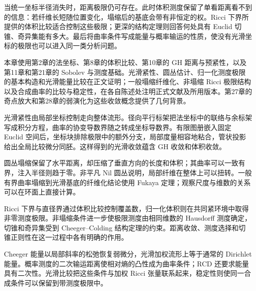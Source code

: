 \ProseParagraphBreak
当统一坐标半径消失时，距离极限仍可存在。此时体积测度保留了单看距离看不到的信息：若纤维长短随位置变化，塌缩后的基底会带有非恒定的权。Ricci 下界所提供的体积比较适合控制这些极限；更深的结构定理则回答何处具有 Euclid 切锥、奇异集能有多大。最后将曲率条件写成能量与概率输运的性质，使没有光滑坐标的极限也可以进入同一类分析问题。

\ProseParagraphBreak
本章使用第2章的法坐标、第8章的体积比较、第10章的 GH 距离与预紧性，以及第11章和第21章的 Sobolev 与测度基础。光滑紧性、圆丛估计、归一化测度极限的基本构造和光滑能量比较在正文证明；一般塌缩纤维化、非塌缩 Ricci 极限结构以及合成曲率的比较与稳定性，在各自陈述处注明正式文献及所用版本。第27章的奇点放大和第28章的弱演化为这些收敛概念提供了几何背景。






\begin{chaptersummary}
	光滑紧性由局部坐标控制走向整体流形。径向平行标架把法坐标中的联络与余标架写成积分方程，曲率的协变导数界随之转成坐标导数界。有限图册嵌入固定 Euclid 空间后，坐标块排除极限中的额外分支，局部度量相容地粘合，管状投影给出全局比较微分同胚。这样得到的光滑收敛蕴含 GH 收敛和体积收敛。

	\ProseParagraphBreak
	圆丛塌缩保留了水平距离，却压缩了垂直方向的长度和体积；其曲率可以一致有界，注入半径则趋于零。非平凡 Nil 圆丛说明，局部纤维在整体上可以扭转。一般有界曲率塌缩到光滑基底的纤维化结论使用 Fukaya 定理；观察尺度与维数的关系可以在环面上直接计算。

	\ProseParagraphBreak
	Ricci 下界与直径界通过体积比较控制覆盖数，归一化体积则在共同紧环境中取得非零测度极限。非塌缩条件进一步使极限测度由相同维数的 Hausdorff 测度确定，切锥和奇异集受到 Cheeger--Colding 结构定理的约束。距离收敛、测度选择和切锥正则性在这一过程中各有明确的作用。

	\ProseParagraphBreak
	Cheeger 能量以局部斜率的松弛恢复弱微分，光滑加权流形上等于通常的 Dirichlet 能量。概率测度的二次输运距离使相对熵的凸性成为曲率条件；RCD 还要求能量具有二次性。光滑比较把这些条件与加权 Ricci 张量联系起来，稳定性则使同一合成条件可以保留到带测度极限中。
\end{chaptersummary}

\BookExercises

